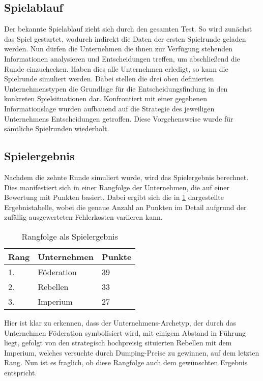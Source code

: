 \subsection{Spielablauf}
Der bekannte Spielablauf zieht sich durch den gesamten Test. So wird zunächst das Spiel gestartet, wodurch indirekt die Daten der ersten Spielrunde geladen werden. Nun dürfen die Unternehmen die ihnen zur Verfügung stehenden Informationen analysieren und Entscheidungen treffen, um abschließend die Runde einzuchecken. Haben dies alle Unternehmen erledigt, so kann die Spielrunde simuliert werden. Dabei stellen die drei oben definierten Unternehmenstypen die Grundlage für die Entscheidungsfindung in den konkreten Spielsituationen dar. Konfrontiert mit einer gegebenen Informationslage wurden aufbauend auf die Strategie des jeweiligen Unternehmens Entscheidungen getroffen. Diese Vorgehensweise wurde für sämtliche Spielrunden wiederholt.

\subsection{Spielergebnis}
Nachdem die zehnte Runde simuliert wurde, wird das Spielergebnis berechnet. Dies manifestiert sich in einer Rangfolge der Unternehmen, die auf einer Bewertung mit Punkten basiert. Dabei ergibt sich die in \ref{tab:junit-spielablauf-ergebnis} dargestellte Ergebnistabelle, wobei die genaue Anzahl an Punkten im Detail aufgrund der zufällig ausgewerteten Fehlerkosten variieren kann.

\begin{table}[htb]
     \centering
     \begin{tabular}{ | l | l | l | }
          \hline
          Rang & Unternehmen & Punkte \\
          \hline \hline
          1. & Föderation & 39 \\ \hline
          2. & Rebellen & 33 \\ \hline
          3. & Imperium & 27 \\ \hline
     \end{tabular}
     \caption{Rangfolge als Spielergebnis}
     \label{tab:junit-spielablauf-ergebnis}
\end{table}

Hier ist klar zu erkennen, dass der Unternehmens-Archetyp, der durch das Unternehmen Föderation symbolisiert wird, mit einigem Abstand in Führung liegt, gefolgt von den strategisch hochpreisig situierten Rebellen mit dem Imperium, welches versuchte durch Dumping-Preise zu gewinnen, auf dem letzten Rang. Nun ist es fraglich, ob diese Rangfolge auch dem gewünschten Ergebnis entspricht.

